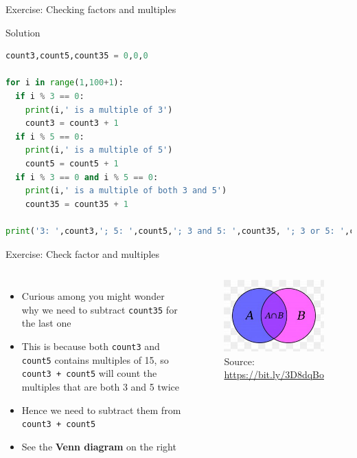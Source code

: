 \documentclass[10pt,xcolor={table,dvipsnames},t]{beamer}
\begin{document}
\begin{frame}[fragile]{Exercise: Checking factors and multiples}
  \begin{exampleblock}{Solution}
\begin{lstlisting}[language=python]
count3,count5,count35 = 0,0,0

for i in range(1,100+1):
  if i % 3 == 0:
    print(i,' is a multiple of 3')
    count3 = count3 + 1
  if i % 5 == 0:
    print(i,' is a multiple of 5')
    count5 = count5 + 1
  if i % 3 == 0 and i % 5 == 0:
    print(i,' is a multiple of both 3 and 5')
    count35 = count35 + 1

print('3: ',count3,'; 5: ',count5,'; 3 and 5: ',count35, '; 3 or 5: ',count3+count5-count35)
\end{lstlisting}
  \end{exampleblock}
\end{frame}

\begin{frame}{Exercise: Check factor and multiples}
  \begin{columns}
    \begin{itemize}
      \item Curious among you might wonder why we need to subtract \texttt{count35} for the last one
      \item This is because both \texttt{count3} and \texttt{count5} contains multiples of 15, so \texttt{count3 + count5} will count the multiples that are both 3 and 5 twice
      \item Hence we need to subtract them from \texttt{count3 + count5}
      \item See the \textbf{Venn diagram} on the right
    \end{itemize}
    \begin{figure}
      \includegraphics[width=\textwidth]{img/inclusion-exclusion.jpg}
      \caption*{Source: \href{https://bit.ly/3D8dqBo}{https://bit.ly/3D8dqBo}}
    \end{figure}
  \end{columns}
\end{frame}
\end{document}
